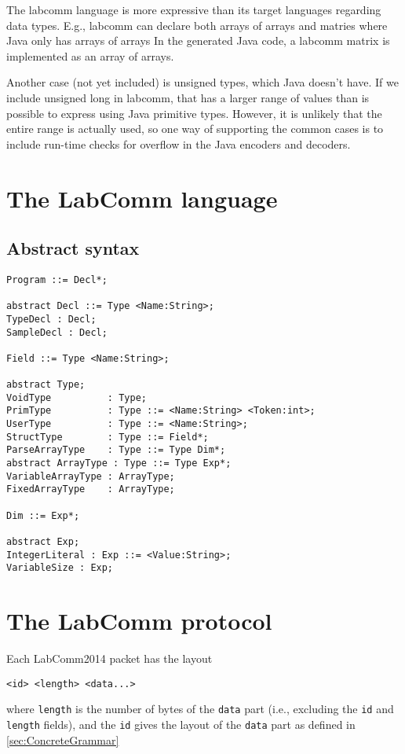 \documentclass[a4paper]{article}
\begin{document}
The labcomm language is more expressive than its target languages regarding data types.
E.g., labcomm can declare both arrays of arrays and matries where Java only has arrays of arrays
In the generated Java code, a labcomm matrix is implemented as an array of arrays.

Another case (not yet included) is unsigned types, which Java doesn't have. If we include
unsigned long in labcomm, that has a larger range of values than is possible to express using
Java primitive types. However, it is unlikely that the entire range is actually used, so one
way of supporting the common cases is to include run-time checks for overflow in the Java encoders
and decoders.

{}


\appendix
\newpage

\section{The LabComm language}
\label{sec:LanguageGrammar}

\subsection{Abstract syntax}
\begin{verbatim}
Program ::= Decl*;

abstract Decl ::= Type <Name:String>;
TypeDecl : Decl;
SampleDecl : Decl;

Field ::= Type <Name:String>;

abstract Type;
VoidType          : Type;
PrimType          : Type ::= <Name:String> <Token:int>;
UserType          : Type ::= <Name:String>;
StructType        : Type ::= Field*;
ParseArrayType    : Type ::= Type Dim*;
abstract ArrayType : Type ::= Type Exp*;
VariableArrayType : ArrayType;
FixedArrayType    : ArrayType;

Dim ::= Exp*;

abstract Exp;
IntegerLiteral : Exp ::= <Value:String>;
VariableSize : Exp;
\end{verbatim}

\newpage
\section{The LabComm protocol}
\label{sec:ProtocolGrammar}

Each LabComm2014 packet has the layout
\begin{verbatim}
<id> <length> <data...>
\end{verbatim}
where \verb+length+ is the number of bytes of the \verb+data+ part
(i.e., excluding the \verb+id+ and \verb+length+ fields), and 
the \verb+id+ gives the layout of the \verb+data+ part as defined 
in \ref{sec:ConcreteGrammar}
\end{document}
